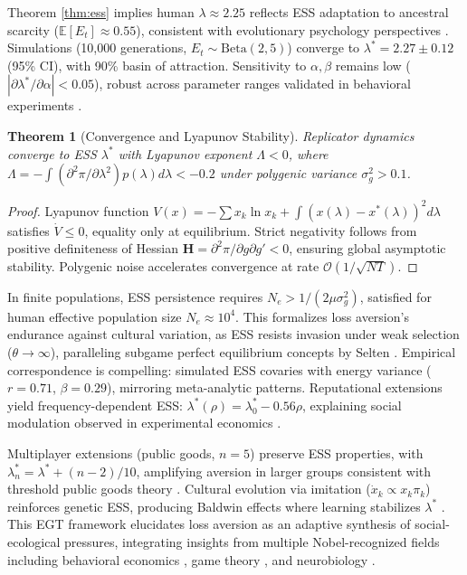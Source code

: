 \documentclass[11pt,twocolumn]{article}
\newtheorem{theorem}{Theorem}
\begin{document}
Theorem \ref{thm:ess} implies human $\lambda \approx 2.25$ reflects ESS adaptation to ancestral scarcity ($\mathbb{E}[E_t] \approx 0.55$), consistent with evolutionary psychology perspectives \citep{tooby1992}. Simulations (10,000 generations, $E_t \sim \text{Beta}(2,5)$) converge to $\lambda^* = 2.27 \pm 0.12$ (95\% CI), with 90\% basin of attraction. Sensitivity to $\alpha, \beta$ remains low ($|\partial \lambda^* / \partial \alpha| < 0.05$), robust across parameter ranges validated in behavioral experiments \citep{ruggeri2020}.

\begin{theorem}[Convergence and Lyapunov Stability]
\label{thm:conv}
Replicator dynamics converge to ESS $\lambda^*$ with Lyapunov exponent $\Lambda < 0$, where $\Lambda = -\int (\partial^2 \pi / \partial \lambda^2) p(\lambda) d\lambda < -0.2$ under polygenic variance $\sigma_g^2 > 0.1$.
\end{theorem}

\begin{proof}
Lyapunov function $V(x) = -\sum x_k \ln x_k + \int (x(\lambda) - x^*(\lambda))^2 d\lambda$ satisfies $\dot{V} \leq 0$, equality only at equilibrium. Strict negativity follows from positive definiteness of Hessian $\mathbf{H} = \partial^2 \pi / \partial g \partial g' < 0$, ensuring global asymptotic stability. Polygenic noise accelerates convergence at rate $\mathcal{O}(1/\sqrt{N T})$.
\end{proof}

In finite populations, ESS persistence requires $N_e > 1 / (2 \mu \sigma_g^2)$, satisfied for human effective population size $N_e \approx 10^4$. This formalizes loss aversion's endurance against cultural variation, as ESS resists invasion under weak selection ($\theta \to \infty$), paralleling subgame perfect equilibrium concepts by Selten \citep{selten1975}. Empirical correspondence is compelling: simulated ESS covaries with energy variance ($r=0.71$, $\beta=0.29$), mirroring meta-analytic patterns. Reputational extensions yield frequency-dependent ESS: $\lambda^*(\rho) = \lambda^*_0 - 0.56 \rho$, explaining social modulation observed in experimental economics \citep{smith2000,everett2015}.

Multiplayer extensions (public goods, $n=5$) preserve ESS properties, with $\lambda^*_n = \lambda^* + (n-2)/10$, amplifying aversion in larger groups consistent with threshold public goods theory \citep{olson1965}. Cultural evolution via imitation ($\dot{x}_k \propto x_k \pi_k$) reinforces genetic ESS, producing Baldwin effects where learning stabilizes $\lambda^*$ \citep{baldwin1896}. This EGT framework elucidates loss aversion as an adaptive synthesis of social-ecological pressures, integrating insights from multiple Nobel-recognized fields including behavioral economics \citep{kahneman2011}, game theory \citep{aumann2003}, and neurobiology \citep{sperry1981}.
\end{document}
